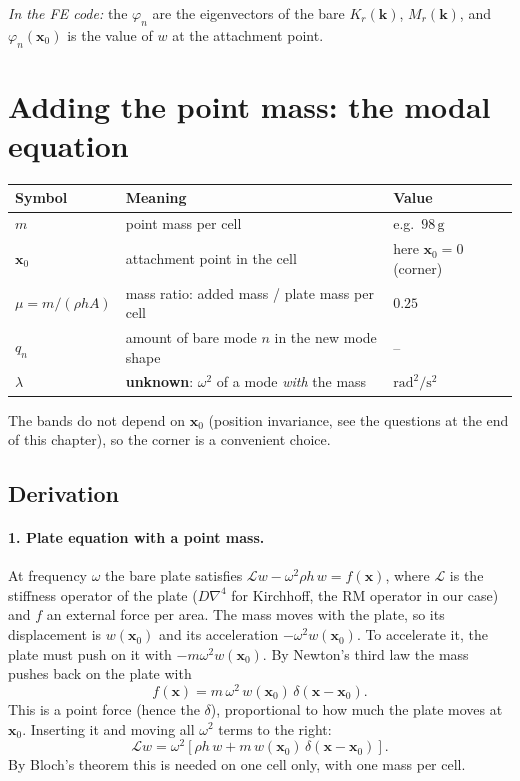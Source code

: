 \emph{In the FE code:} the $\varphi_n$ are the eigenvectors of the bare
$K_r(\mathbf{k})$, $M_r(\mathbf{k})$, and $\varphi_n(\mathbf{x}_0)$ is the
value of $w$ at the attachment point.

\section{Adding the point mass: the modal equation}

\begin{center}
\begin{tabular}{|l|p{}|l|}
\hline
Symbol & Meaning & Value \\
\hline
$m$ & point mass per cell & e.g.\ $98\,\mathrm{g}$ \\
$\mathbf{x}_0$ & attachment point in the cell & here $\mathbf{x}_0 = 0$ (corner) \\
$\mu = m/(\rho h A)$ & mass ratio: added mass / plate mass per cell & $0.25$ \\
$q_n$ & amount of bare mode $n$ in the new mode shape & -- \\
$\lambda$ & \textbf{unknown}: $\omega^2$ of a mode \emph{with} the mass & $\mathrm{rad^2/s^2}$ \\
\hline
\end{tabular}
\end{center}
The bands do not depend on $\mathbf{x}_0$ (position invariance, see the
questions at the end of this chapter), so the corner is a convenient choice.

\subsection{Derivation}

\paragraph{1. Plate equation with a point mass.}
At frequency $\omega$ the bare plate satisfies
$\mathcal{L} w - \omega^2 \rho h\, w = f(\mathbf{x})$, where $\mathcal{L}$ is
the stiffness operator of the plate ($D\nabla^4$ for Kirchhoff, the RM
operator in our case) and $f$ an external force per area. The mass moves with
the plate, so its displacement is $w(\mathbf{x}_0)$ and its acceleration
$-\omega^2 w(\mathbf{x}_0)$. To accelerate it, the plate must push on it with
$-m\omega^2 w(\mathbf{x}_0)$. By Newton's third law the mass pushes back on the
plate with
\begin{equation}
  f(\mathbf{x}) = m\,\omega^2\, w(\mathbf{x}_0)\, \delta(\mathbf{x} - \mathbf{x}_0) .
\end{equation}
This is a point force (hence the $\delta$), proportional to how much the plate
moves at $\mathbf{x}_0$. Inserting it and moving all $\omega^2$ terms to the
right:
\begin{equation}
  \mathcal{L} w = \omega^2 \left[ \rho h\, w + m\, w(\mathbf{x}_0)\, \delta(\mathbf{x} - \mathbf{x}_0) \right] .
  \label{eq:plate_with_mass}
\end{equation}
By Bloch's theorem this is needed on one cell only, with one mass per cell.

